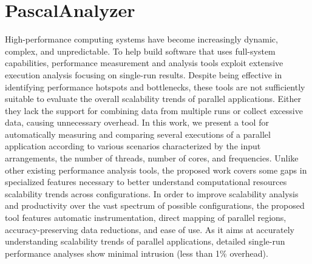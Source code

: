 \section{PascalAnalyzer} \label{sec:pascal_analyzer}
High-performance computing systems have become increasingly dynamic, complex, and unpredictable. To help build software that uses full-system capabilities, performance measurement and analysis tools exploit extensive execution analysis focusing on single-run results. Despite being effective in identifying performance hotspots and bottlenecks, these tools are not sufficiently suitable to evaluate the overall scalability trends of parallel applications. Either they lack the support for combining data from multiple runs or collect excessive data, causing unnecessary overhead. 
In this work, we present a tool for automatically measuring and comparing several executions of a parallel application according to various scenarios characterized by the input arrangements, the number of threads, number of cores, and frequencies.
Unlike other existing performance analysis tools, the proposed work covers some gaps in specialized features necessary to better understand computational resources scalability trends across configurations. 
In order to improve scalability analysis and productivity over the vast spectrum of possible configurations, the proposed tool features automatic instrumentation, direct mapping of parallel regions, accuracy-preserving data reductions, and ease of use.
As it aims at accurately understanding scalability trends of parallel applications, detailed single-run performance analyses show minimal intrusion (less than 1\% overhead).

